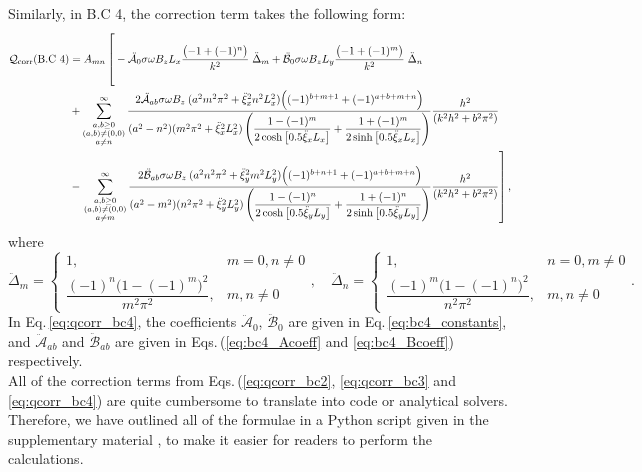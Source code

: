 \documentclass[aps,prfluids,reprint,superscriptaddress]{revtex4-2}
\newcommand{\ii}[1]{\text{#1}}
\newcommand{\nn}{\nonumber}
\begin{document}
\\
\indent Similarly, in B.C 4, the correction term takes the following form:
\begin{align}
	\nn
	\mathcal{Q}_{\rm corr}  (\ii{B.C 4}) &=
	A_{mn}  \left[ \rule{0pt}{1cm}
	- \ddot{\mathcal A}_0 \sigma\omega B_z L_x
	\dfrac{ \bigl( -1 + (-1)^n \bigr) }{k^2}\; \ddot\Delta_{m}
	+
	\ddot{\mathcal B}_0 \sigma\omega B_z L_y
	\dfrac{ \bigl( -1 + (-1)^m \bigr) }{k^2}\; \ddot\Delta_{n}
	\right.
	\\
	\nn
	& +
	\sum_{\substack{a, b \geq 0 \\ (a,b) 
			\neq (0,0) \\
			a\neq n	
	}}^{\infty}
	\frac{ 2 \ddot{\mathcal A}_{ab} \sigma \omega B_z 
		\:(a^2m^2\pi^2 + {\ddot\xi_x}^2n^2L_x^2)
		\Bigl( (-1)^{b+m+1} + (-1)^{a+b+m+n} \Bigr) }
	{(a^2-n^2) (m^2\pi^2 + {\ddot\xi_x}^2L_x^2)
		\left(
		\dfrac{1-(-1)^m}{2\cosh{\bigl[0.5\ddot\xi_x L_x \bigr]}} + \dfrac{1+(-1)^m}{2\sinh{\bigl[0.5\ddot\xi_x L_x \bigr]}}
		\right)
	}
	\frac{h^2}{(k^2h^2 + b^2\pi^2)}
	\\
	& - 
	\left.
	\sum_{\substack{a, b \geq 0 \\ (a,b) 
			\neq (0,0)\\
			a\neq m	
	}}^{\infty}
	\frac{ 	2 \ddot{\mathcal B}_{ab} \sigma \omega B_z 
		\: (a^2n^2\pi^2 + {\ddot\xi_y}^2m^2L_y^2)
		\Bigl( (-1)^{b+n+1} + (-1)^{a+b+m+n} \Bigr) }
	{(a^2 - m^2)
		(n^2\pi^2 + {\ddot\xi_y}^2L_y^2)
		\left(
		\dfrac{1-(-1)^n}{2\cosh{\bigl[0.5\ddot\xi_y L_y \bigr]}} + \dfrac{1+(-1)^n}{2\sinh{\bigl[0.5\ddot\xi_y L_y \bigr]}}
		\right)
	}
		\frac{h^2}{(k^2h^2 + b^2\pi^2)}
	\rule{0pt}{1cm} \right] ,
	\label{eq:qcorr_bc4}
\end{align} 
where
\begin{equation}
	\ddot\Delta_{m}=
	\left\{
	\begin{array}{rl}
		1, & m=0, n\neq 0 \\
		\dfrac{(-1)^n \bigl(1 - (-1)^m \bigr)^2}{m^2\pi^2}, & m, n\neq 0
	\end{array}
	\right.
	,\quad
	\ddot\Delta_{n}=
	\left\{
	\begin{array}{rl}
		1, & n=0, m\neq 0 \\
		\dfrac{(-1)^m \bigl(1 - (-1)^n \bigr)^2}{n^2\pi^2}, & m, n\neq 0
	\end{array}
	\right. .
	\label{eq:qcorr_bc3_consts}
\end{equation}
In Eq.\,\eqref{eq:qcorr_bc4}, the coefficients $\ddot{\mathcal A}_0$, $\ddot{\mathcal B}_0$ are given in Eq.\,\eqref{eq:bc4_constants}, and $\ddot{\mathcal{A}}_{ab}$ and $\ddot{\mathcal B}_{ab}$ are given in Eqs.\,(\ref{eq:bc4_Acoeff} and \ref{eq:bc4_Bcoeff}) respectively.   
\\
\indent All of the correction terms from Eqs.\,(\ref{eq:qcorr_bc2}, \ref{eq:qcorr_bc3} and \ref{eq:qcorr_bc4}) are quite cumbersome to translate into code or analytical solvers. Therefore, we have outlined all of the formulae in a Python script given in the supplementary material \cite{SMmagdamp_hegde}, to make it easier for readers to perform the calculations.  
\end{document}

